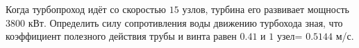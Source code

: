 Когда турбопроход идёт со скоростью $15$ узлов, турбина его развивает
мощность $3800$ кВт. Определить силу сопротивления воды движению
турбохода зная, что коэффициент полезного действия трубы и винта равен
$0.41$ и $1$ узел= $0.5144$ м/с.
